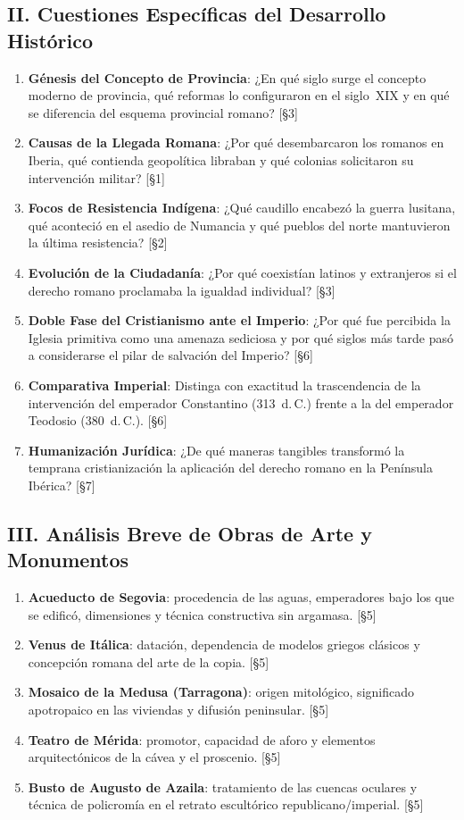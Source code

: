 \documentclass[11pt,letterpaper]{article}
\begin{document}
\subsection*{II. Cuestiones Específicas del Desarrollo Histórico}
\begin{enumerate}[resume]
  \item \textbf{Génesis del Concepto de Provincia}: ¿En qué siglo surge el concepto moderno de provincia, qué reformas lo configuraron en el siglo~XIX y en qué se diferencia del esquema provincial romano? [§3]
  \item \textbf{Causas de la Llegada Romana}: ¿Por qué desembarcaron los romanos en Iberia, qué contienda geopolítica libraban y qué colonias solicitaron su intervención militar? [§1]
  \item \textbf{Focos de Resistencia Indígena}: ¿Qué caudillo encabezó la guerra lusitana, qué aconteció en el asedio de Numancia y qué pueblos del norte mantuvieron la última resistencia? [§2]
  \item \textbf{Evolución de la Ciudadanía}: ¿Por qué coexistían latinos y extranjeros si el derecho romano proclamaba la igualdad individual? [§3]
  \item \textbf{Doble Fase del Cristianismo ante el Imperio}: ¿Por qué fue percibida la Iglesia primitiva como una amenaza sediciosa y por qué siglos más tarde pasó a considerarse el pilar de salvación del Imperio? [§6]
  \item \textbf{Comparativa Imperial}: Distinga con exactitud la trascendencia de la intervención del emperador Constantino (313~d.\,C.) frente a la del emperador Teodosio (380~d.\,C.). [§6]
  \item \textbf{Humanización Jurídica}: ¿De qué maneras tangibles transformó la temprana cristianización la aplicación del derecho romano en la Península Ibérica? [§7]
\end{enumerate}

\subsection*{III. Análisis Breve de Obras de Arte y Monumentos}
\begin{enumerate}[resume]
  \item \textbf{Acueducto de Segovia}: procedencia de las aguas, emperadores bajo los que se edificó, dimensiones y técnica constructiva sin argamasa. [§5]
  \item \textbf{Venus de Itálica}: datación, dependencia de modelos griegos clásicos y concepción romana del arte de la copia. [§5]
  \item \textbf{Mosaico de la Medusa (Tarragona)}: origen mitológico, significado apotropaico en las viviendas y difusión peninsular. [§5]
  \item \textbf{Teatro de Mérida}: promotor, capacidad de aforo y elementos arquitectónicos de la cávea y el proscenio. [§5]
  \item \textbf{Busto de Augusto de Azaila}: tratamiento de las cuencas oculares y técnica de policromía en el retrato escultórico republicano/imperial. [§5]
\end{enumerate}
\end{document}
